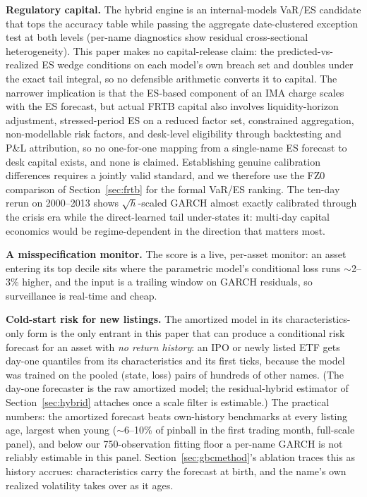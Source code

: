 \documentclass[11pt]{article}
\theoremstyle{remark}
\begin{document}
\textbf{Regulatory capital.} The
hybrid engine is an internal-models VaR/ES candidate that tops the
accuracy table while passing the aggregate date-clustered exception
test at both levels (per-name diagnostics show residual
cross-sectional heterogeneity). This paper makes no
capital-release claim: the predicted-vs-realized ES wedge conditions
on each model's own breach set and doubles under the exact tail
integral, so no defensible arithmetic converts it to capital. The narrower implication is that the ES-based component
of an IMA charge scales with the ES forecast, but actual FRTB capital
also involves liquidity-horizon adjustment, stressed-period ES on a
reduced factor set, constrained aggregation, non-modellable risk
factors, and desk-level eligibility through backtesting and P\&L attribution, so no one-for-one mapping from a single-name ES
forecast to desk capital exists, and none is claimed. Establishing
genuine calibration differences requires a jointly valid standard,
and we therefore use the FZ0 comparison of Section~\ref{sec:frtb} for the
formal VaR/ES ranking. The ten-day rerun on
2000--2013 shows $\sqrt{h}$-scaled GARCH almost exactly calibrated
through the crisis era while the direct-learned tail under-states it:
multi-day capital economics would be regime-dependent in the direction
that matters most.

\textbf{A misspecification monitor.} The score is a live, per-asset
monitor: an asset entering its top decile sits where the parametric
model's conditional loss runs $\sim$2--3\% higher, and the input is a
trailing window on GARCH residuals, so surveillance is real-time and
cheap.

\textbf{Cold-start risk for new listings.} The amortized model in its
characteristics-only form is the
only entrant in this paper that can produce a conditional risk forecast
for an asset with \emph{no return history}: an IPO or newly listed
ETF gets day-one quantiles from its characteristics and
its first ticks, because the model was trained on the pooled
(state, loss) pairs of hundreds of other names. (The day-one forecaster is the raw amortized model; the
residual-hybrid estimator of Section~\ref{sec:hybrid} attaches once a
scale filter is estimable.) The practical numbers:
the amortized forecast beats own-history benchmarks at every
listing age, largest when young ($\sim$6--10\% of pinball in the
first trading month, full-scale panel), and below our
750-observation fitting floor a per-name GARCH is not reliably
estimable in this panel. Section~\ref{sec:gbcmethod}'s ablation traces this as
history accrues: characteristics carry the forecast at birth, and
the name's own realized volatility takes over as it ages.
\end{document}
